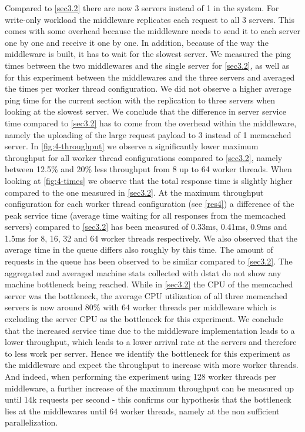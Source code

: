 \documentclass[11pt,a4paper]{article}
\begin{document}
Compared to \autoref{sec3.2} there are now 3 servers instead of 1 in the system. For write-only workload the middleware replicates each request to all 3 servers. This comes with some overhead because the middleware needs to send it to each server one by one and receive it one by one. In addition, because of the way the middleware is built, it has to wait for the slowest server. We measured the ping times between the two middlewares and the single server for \autoref{sec3.2}, as well as for this experiment between the middlewares and the three servers and averaged the times per worker thread configuration. We did not observe a higher average ping time for the current section with the replication to three servers when looking at the slowest server. We conclude that the difference in server service time compared to \autoref{sec3.2} has to come from the overhead within the middleware, namely the uploading of the large request payload to 3 instead of 1 memcached server.
In \autoref{fig:4-throughput} we observe a significantly lower maximum throughput for all worker thread configurations compared to \autoref{sec3.2}, namely between 12.5\% and 20\% less throughput from 8 up to 64 worker threads. When looking at \autoref{fig:4-times} we observe that the total response time is slightly higher compared to the one measured in \autoref{sec3.2}.
At the maximum throughput configuration for each worker thread configuration (see \autoref{res4}) a difference of the peak service time (average time waiting for all responses from the memcached servers) compared to \autoref{sec3.2} has been measured of 0.33ms, 0.41ms, 0.9ms and 1.5ms for 8, 16, 32 and 64 worker threads respectively. We also observed that the average time in the queue differs also roughly by this time. The amount of requests in the queue has been observed to be similar compared to \autoref{sec3.2}. 
The aggregated and averaged machine stats collected with dstat do not show any machine bottleneck being reached. While in \autoref{sec3.2} the CPU of the memcached server was the bottleneck, the average CPU utilization of all three memcached servers is now around 80\% with 64 worker threads per middleware which is excluding the server CPU as the bottleneck for this experiment. We conclude that the increased service time due to the middleware implementation leads to a lower throughput, which leads to a lower arrival rate at the servers and therefore to less work per server. Hence we identify the bottleneck for this experiment as the middleware and expect the throughput to increase with more worker threads. And indeed, when performing the experiment using 128 worker threads per middleware, a further increase of the maximum throughput can be measured up until 14k requests per second - this confirms our hypothesis that the bottleneck lies at the middlewares until 64 worker threads, namely at the non sufficient parallelization.
\end{document}
